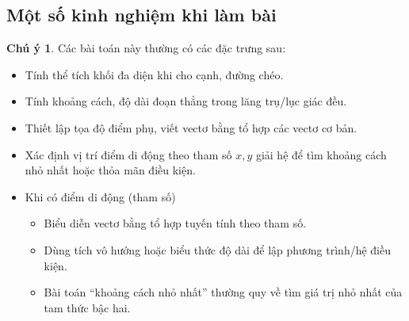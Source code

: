 \documentclass[12pt,a4paper,oneside]{book}
\theoremstyle{theorem}
\theoremstyle{definition}
\newtheorem{cy}[theorem2]{Chú ý}
\begin{document}
    \subsection{Một số kinh nghiệm khi làm bài}
    \begin{cy}
        Các bài toán này thường có các đặc trưng sau:
        \begin{itemize}
            \item Tính thể tích khối đa diện khi cho cạnh, đường chéo.
        \end{itemize}
        \begin{itemize}
            \item Tính khoảng cách, độ dài đoạn thẳng trong lăng trụ/lục giác đều.
            
            \item Thiết lập tọa độ điểm phụ, viết vectơ bằng tổ hợp các vectơ cơ bản.
            
            \item Xác định vị trí điểm di động theo tham số $x,y$ giải hệ để tìm khoảng cách nhỏ nhất hoặc thỏa mãn điều kiện.
            
            \item Khi có điểm di động (tham số)
            \begin{itemize}
                \item Biểu diễn vectơ bằng tổ hợp tuyến tính theo tham số.
                \item Dùng tích vô hướng hoặc biểu thức độ dài để lập phương trình/hệ điều kiện.
                \item Bài toán ``khoảng cách nhỏ nhất'' thường quy về tìm giá trị nhỏ nhất của tam thức bậc hai.
            \end{itemize}
            \end{itemize}
    \end{cy}
\end{document}
